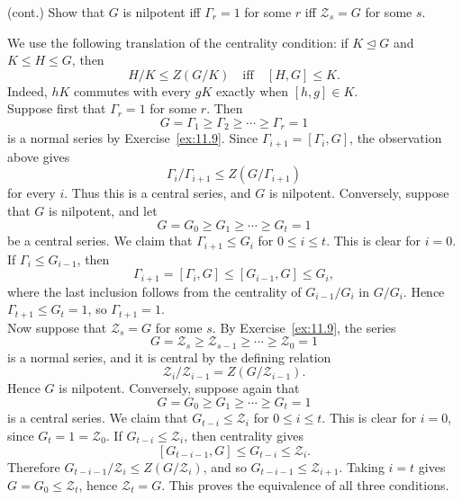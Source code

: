 \documentclass[../Odyssey_Project.tex]{subfiles}
\begin{document}
\begin{exercise}
\label{ex:11.10}
(cont.) Show that $G$ is nilpotent iff $\Gamma_r = 1$ for some $r$ iff $\mathcal{Z}_s = G$ for some $s$.
\end{exercise}
\begin{solution}
    We use the following translation of the centrality condition: if $K\trianglelefteq G$ and $K\leq H\leq G$, then
    \[
        H/K\leq Z(G/K)
        \quad\text{iff}\quad
        [H,G]\leq K.
    \]
    Indeed, $hK$ commutes with every $gK$ exactly when $[h,g]\in K$.\\
    Suppose first that $\Gamma_r=1$ for some $r$. Then
    \[
        G=\Gamma_1\geq \Gamma_2\geq \cdots \geq \Gamma_r=1
    \]
    is a normal series by Exercise~\ref{ex:11.9}. Since $\Gamma_{i+1}=[\Gamma_i,G]$, the observation above gives
    \[
        \Gamma_i/\Gamma_{i+1}\leq Z(G/\Gamma_{i+1})
    \]
    for every $i$. Thus this is a central series, and $G$ is nilpotent. Conversely, suppose that $G$ is nilpotent, and let
    \[
        G=G_0\geq G_1\geq \cdots \geq G_t=1
    \]
    be a central series. We claim that $\Gamma_{i+1}\leq G_i$ for $0\leq i\leq t$. This is clear for $i=0$. If $\Gamma_i\leq G_{i-1}$, then
    \[
        \Gamma_{i+1}=[\Gamma_i,G]\leq [G_{i-1},G]\leq G_i,
    \]
    where the last inclusion follows from the centrality of $G_{i-1}/G_i$ in $G/G_i$. Hence $\Gamma_{t+1}\leq G_t=1$, so $\Gamma_{t+1}=1$.\\
    Now suppose that $\mathcal{Z}_s=G$ for some $s$. By Exercise~\ref{ex:11.9}, the series
    \[
        G=\mathcal{Z}_s\geq \mathcal{Z}_{s-1}\geq \cdots \geq \mathcal{Z}_0=1
    \]
    is a normal series, and it is central by the defining relation
    \[
        \mathcal{Z}_i/\mathcal{Z}_{i-1}=Z(G/\mathcal{Z}_{i-1}).
    \]
    Hence $G$ is nilpotent. Conversely, suppose again that
    \[
        G=G_0\geq G_1\geq \cdots \geq G_t=1
    \]
    is a central series. We claim that $G_{t-i}\leq \mathcal{Z}_i$ for $0\leq i\leq t$. This is clear for $i=0$, since $G_t=1=\mathcal{Z}_0$. If $G_{t-i}\leq \mathcal{Z}_i$, then centrality gives
    \[
        [G_{t-i-1},G]\leq G_{t-i}\leq \mathcal{Z}_i.
    \]
    Therefore $G_{t-i-1}/\mathcal{Z}_i\leq Z(G/\mathcal{Z}_i)$, and so $G_{t-i-1}\leq \mathcal{Z}_{i+1}$. Taking $i=t$ gives $G=G_0\leq \mathcal{Z}_t$, hence $\mathcal{Z}_t=G$. This proves the equivalence of all three conditions.
\end{solution}
\end{document}
